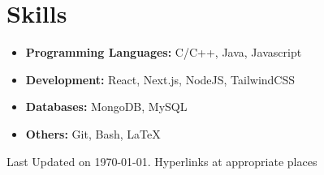 \documentclass[11pt,a4paper,calibri]{moderncv}        %
\begin{document}
	\section{Skills}
	
	\begin{itemize}[leftmargin=.2in]
		\setlength\itemsep{.2em}
		
		\item \textbf{Programming Languages:} C/C++, Java, Javascript
		\vspace{-4pt}
		\item \textbf{Development:} React, Next.js, NodeJS, TailwindCSS
		\vspace{-4pt}
		\item \textbf{Databases:} MongoDB, MySQL
		\vspace{-4pt}
		\item \textbf{Others:} Git, Bash, \LaTeX	 
		
	\end{itemize}

	
		
	
	
	\vfill
	\textnormal{\footnotesize Last Updated on \today. Hyperlinks at appropriate places}
	
%	
	
	
	
\end{document}
